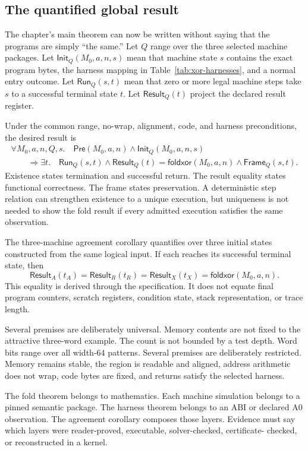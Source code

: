 \subsection{The quantified global result}

The chapter's main theorem can now be written without saying that the programs
are simply ``the same.'' Let \(Q\) range over the three selected machine
packages. Let \(\mathsf{Init}_Q(M_0,a,n,s)\) mean that machine state \(s\)
contains the exact program bytes, the harness mapping in
Table~\ref{tab:xor-harnesses}, and a normal entry outcome. Let
\(\mathsf{Run}_Q(s,t)\) mean that zero or more legal machine steps take
\(s\) to a successful terminal state \(t\). Let
\(\mathsf{Result}_Q(t)\) project the declared result register.

Under the common range, no-wrap, alignment, code, and harness preconditions,
the desired result is
\[
 \begin{array}{l}
 \forall M_0,a,n,Q,s.\quad
 \mathsf{Pre}(M_0,a,n)\land\mathsf{Init}_Q(M_0,a,n,s)\\
 \qquad\Longrightarrow
 \exists t.\quad
 \mathsf{Run}_Q(s,t)\land
 \mathsf{Result}_Q(t)=\mathsf{foldxor}(M_0,a,n)\land
 \mathsf{Frame}_Q(s,t).
 \end{array}
\]
Existence states termination and successful return. The result equality states
functional correctness. The frame states preservation. A deterministic step
relation can strengthen existence to a unique execution, but uniqueness is not
needed to show the fold result if every admitted execution satisfies the same
observation.

The three-machine agreement corollary quantifies over three initial states
constructed from the same logical input. If each reaches its successful
terminal state, then
\[
 \mathsf{Result}_A(t_A)
 =\mathsf{Result}_R(t_R)
 =\mathsf{Result}_X(t_X)
 =\mathsf{foldxor}(M_0,a,n).
\]
This equality is derived through the specification. It does not equate final
program counters, scratch registers, condition state, stack representation, or
trace length.

Several premises are deliberately universal. Memory contents are not fixed to
the attractive three-word example. The count is not bounded by a test depth.
Word bits range over all width-64 patterns. Several premises are deliberately
restricted. Memory remains stable, the region is readable and aligned, address
arithmetic does not wrap, code bytes are fixed, and returns satisfy the
selected harness.

\begin{archive}[title={The theorem has four named layers}]
The fold theorem belongs to mathematics. Each machine simulation belongs to a
pinned semantic package. The harness theorem belongs to an ABI or declared A0
observation. The agreement corollary composes those layers. Evidence must say
which layers were reader-proved, executable, solver-checked, certificate-
checked, or reconstructed in a kernel.
\end{archive}

